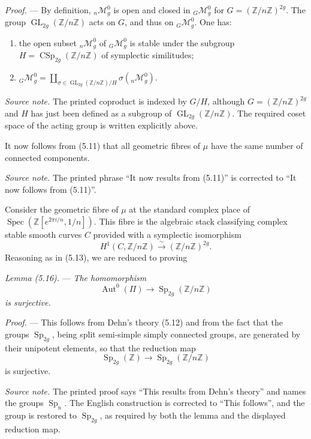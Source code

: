 \documentclass[10pt]{article}
\newcommand{\Spec}{\operatorname{Spec}}
\newcommand{\Aut}{\operatorname{Aut}}
\begin{document}
\noindent\emph{Proof.} --- By definition, ${}_n\mathcal M_g^0$ is open and closed in ${}_G\mathcal M_g^0$ for $G=(\mathbb Z/n\mathbb Z)^{2g}$. The group $\operatorname{GL}_{2g}(\mathbb Z/n\mathbb Z)$ acts on $G$, and thus on ${}_G\mathcal M_g^0$. One has:
\begin{enumerate}[label=(\roman*)]
\item the open subset ${}_n\mathcal M_g^0$ of ${}_G\mathcal M_g^0$ is stable under the subgroup $H=\operatorname{CSp}_{2g}(\mathbb Z/n\mathbb Z)$ of symplectic similitudes;
\item ${}_G\mathcal M_g^0=\coprod_{\sigma\in\operatorname{GL}_{2g}(\mathbb Z/n\mathbb Z)/H}\sigma({}_n\mathcal M_g^0)$.
\end{enumerate}

\noindent\textit{Source note.} The printed coproduct is indexed by $G/H$, although $G=(\mathbb Z/n\mathbb Z)^{2g}$ and $H$ has just been defined as a subgroup of $\operatorname{GL}_{2g}(\mathbb Z/n\mathbb Z)$. The required coset space of the acting group is written explicitly above.

It now follows from (5.11) that all geometric fibres of $\mu$ have the same number of connected components.

\noindent\textit{Source note.} The printed phrase ``It now results from (5.11)'' is corrected to ``It now follows from (5.11)''.

Consider the geometric fibre of $\mu$ at the standard complex place of $\Spec(\mathbb Z[e^{2\pi i/n},1/n])$. This fibre is the algebraic stack classifying complex stable smooth curves $C$ provided with a symplectic isomorphism
\[
H^1(C,\mathbb Z/n\mathbb Z)\xrightarrow{\sim}(\mathbb Z/n\mathbb Z)^{2g}.
\]
Reasoning as in (5.13), we are reduced to proving

\medskip
\noindent\emph{Lemma (5.16).} --- \emph{The homomorphism}
\[
\Aut^0(\Pi)\longrightarrow \operatorname{Sp}_{2g}(\mathbb Z/n\mathbb Z)
\]
\emph{is surjective.}

\noindent\emph{Proof.} --- This follows from Dehn's theory (5.12) and from the fact that the groups $\operatorname{Sp}_{2g}$, being split semi-simple simply connected groups, are generated by their unipotent elements, so that the reduction map
\[
\operatorname{Sp}_{2g}(\mathbb Z)\longrightarrow \operatorname{Sp}_{2g}(\mathbb Z/n\mathbb Z)
\]
is surjective.

\noindent\textit{Source note.} The printed proof says ``This results from Dehn's theory'' and names the groups $\operatorname{Sp}_n$. The English construction is corrected to ``This follows'', and the group is restored to $\operatorname{Sp}_{2g}$, as required by both the lemma and the displayed reduction map.
\end{document}
